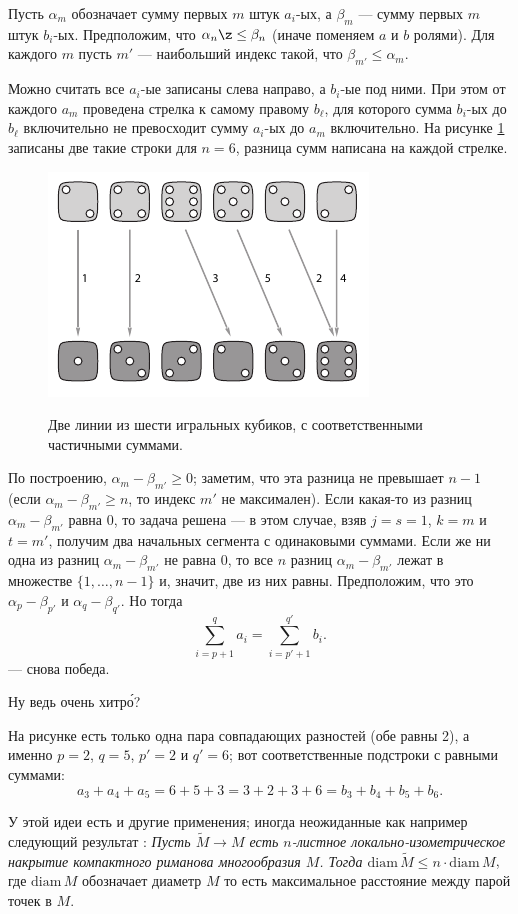 Пусть $\alpha_m$ обозначает сумму первых $m$ штук $a_i$-ых,
а $\beta_m$ --- сумму первых $m$ штук $b_i$-ых.
Предположим, что $\alpha_n\z\le \beta_n$ (иначе поменяем $a$ и $b$ ролями).
Для каждого $m$ пусть $m'$ --- наибольший индекс такой, что $\beta_{m'}\le \alpha_m$.

Можно считать все $a_i$-ые записаны слева направо, а $b_i$-ые под ними.
При этом от каждого $a_m$ проведена стрелка к самому правому $b_\ell$, для которого сумма $b_i$-ых до $b_\ell$ включительно не превосходит сумму $a_i$-ых до $a_m$ включительно.
На рисунке \ref{pic:kubiki} записаны две такие строки для $n=6$,
разница сумм написана на каждой стрелке.

\begin{figure}[h!]
\centering
\includegraphics[scale=1]{pics/kubiki}
\label{pic:kubiki}
\caption{Две линии из шести игральных кубиков, с соответственными частичными суммами.}
\end{figure}

По построению, $\alpha_m-\beta_{m'}\ge 0$;
заметим, что эта разница не превышает $n-1$ 
(если $\alpha_m-\beta_{m'}\ge n$, то индекс $m'$ не максимален).
Если какая-то из разниц $\alpha_m-\beta_{m'}$ равна $0$, то задача решена --- в этом случае, взяв $j=s=1$, $k=m$ и $t=m'$, получим два начальных сегмента с одинаковыми суммами.
Если же ни одна из разниц $\alpha_m-\beta_{m'}$ не равна $0$, то все $n$ разниц 
$\alpha_m-\beta_{m'}$ лежат в множестве $\{1,\dots,n-1\}$ и, значит, две из них равны.
Предположим, что это $\alpha_p-\beta_{p'}$ и $\alpha_q-\beta_{q'}$.
Но тогда 
\[\sum_{i=p+1}^qa_i=\sum_{i=p'+1}^{q'}b_i.\]
--- снова победа.

Ну ведь очень хитр\'{о}?

На рисунке есть только одна пара совпадающих разностей (обе равны 2), а именно $p=2$, $q=5$, $p'=2$ и $q'=6$;
вот соответственные подстроки с равными суммами:
\[a_3+a_4+a_5=6+5+3=3+2+3+6=b_3+b_4+b_5+b_6.\]

\begin{addedbytheeditors}
У этой идеи есть и другие применения; иногда неожиданные как например следующий результат \cite{petrunin}:
\textit{Пусть $\tilde M\to M$ есть $n$-листное локально-изометрическое накрытие компактного риманова многообразия $M$.
Тогда $\mathrm{diam}\, \tilde M\le n\cdot \mathrm{diam}\, M$}, где $\mathrm{diam}\, M$ обозначает диаметр $M$ то есть максимальное расстояние между парой точек в $M$.
\end{addedbytheeditors}
